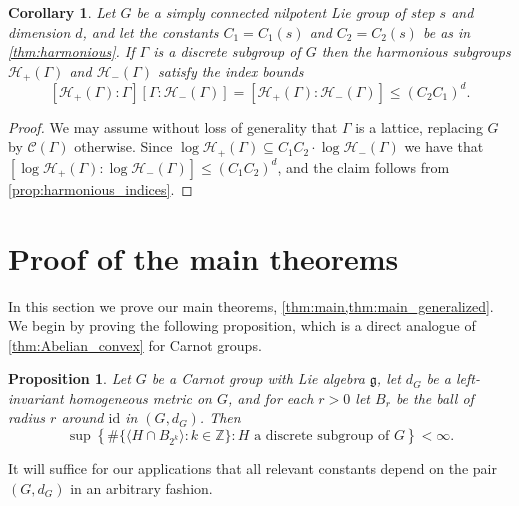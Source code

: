 \documentclass[11pt]{article}
\numberwithin{equation}{section}
\theoremstyle{plain}
\newtheorem{corollary}[thm]{Corollary}
\newtheorem{proposition}[thm]{Proposition}
\theoremstyle{definition}
\theoremstyle{remark}
\numberwithin{equation}{section}
\newcommand{\Z}{\mathbb Z}
\numberwithin{equation}{section}
\begin{document}
\begin{corollary}
\label{cor:harmonious_bounded_index}
Let $G$ be a simply connected nilpotent Lie group of step $s$ and dimension $d$, and let the constants $C_1=C_1(s)$ and $C_2=C_2(s)$ be as in \cref{thm:harmonious}. If $\Gamma$ is a discrete subgroup of $G$ then the harmonious subgroups $\mathscr{H}_+(\Gamma)$ and $\mathscr{H}_-(\Gamma)$ satisfy the index bounds
\[
[\mathscr{H}_+(\Gamma):\Gamma][\Gamma:\mathscr{H}_-(\Gamma)]= [\mathscr{H}_+(\Gamma):\mathscr{H}_-(\Gamma)] \leq (C_2C_1)^d.
\]
%
\end{corollary}

\begin{proof} 
We may assume without loss of generality that $\Gamma$ is a lattice, replacing $G$ by $\mathscr{C}(\Gamma)$  otherwise. Since $\log \mathscr{H}_+(\Gamma) \subseteq C_1C_2 \cdot \log \mathscr{H}_-(\Gamma)$ we have that $[\log \mathscr{H}_+(\Gamma):\log \mathscr{H}_-(\Gamma)]\leq (C_1C_2)^d$, and the claim follows from \cref{prop:harmonious_indices}.
\end{proof}

\section{Proof of the main theorems}
\label{sec:wrap_up}

In this section we prove our main theorems, \cref{thm:main,thm:main_generalized}. We begin by proving the following proposition, which is a direct analogue of \cref{thm:Abelian_convex} for Carnot groups. 
%


%



%
%
%
%
%
%
%
%
%



\begin{proposition}
\label{prop:exploring_Carnot_subgroup}
Let $G$ be a Carnot group with Lie algebra $\mathfrak{g}$, let $d_G$ be a left-invariant homogeneous metric on $G$, and for each $r>0$ let $B_r$ be the ball of radius $r$ around $\mathrm{id}$ in $(G,d_G)$. Then
\[
\sup\left\{\#\{\langle H \cap B_{2^k} \rangle : k \in \Z\} : H \text{ a discrete subgroup of $G$}\right\} <\infty.
\]
\end{proposition}

It will suffice for our applications that all relevant constants depend on the pair $(G,d_G)$ in an arbitrary fashion. %
\end{document}
